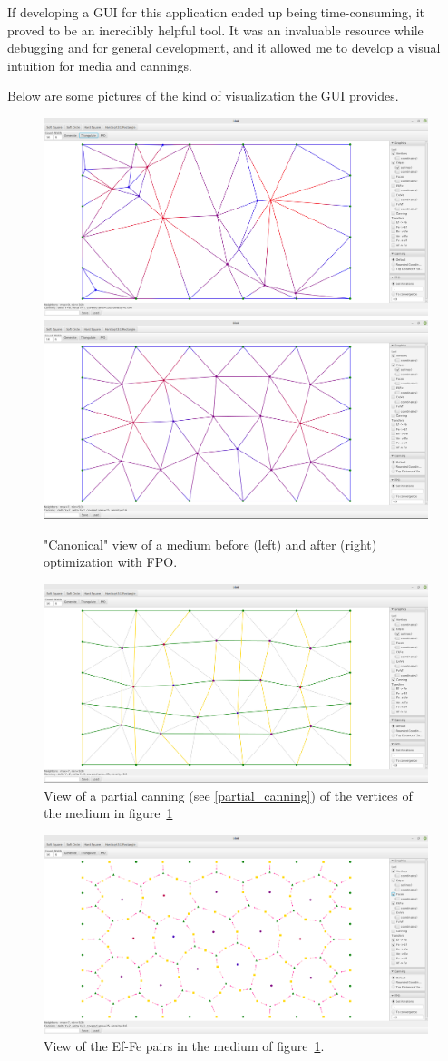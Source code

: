 \documentclass{article}
\begin{document}
If developing a GUI for this application ended up being time-consuming, it proved to be an incredibly helpful tool. It was an invaluable resource while debugging and for general development, and it allowed me to develop a visual intuition for media and cannings.
$ $

Below are some pictures of the kind of visualization the GUI provides.

\begin{figure}[h]
	\centering\includegraphics[width=0.45\linewidth]{assets/canonical_before.png}
	\centering\includegraphics[width=0.45\linewidth]{assets/canonical_after.png}
	\caption{"Canonical" view of a medium before (left) and after (right) optimization with FPO.}
	\label{fig:gui_before_after_FPO}
\end{figure}

\begin{figure}[h]
	\centering\includegraphics[width=0.8\linewidth]{assets/canning_view.png}
	\caption{View of a partial canning (see \ref{partial_canning}) of the vertices of the medium in figure~\ref{fig:gui_before_after_FPO}}
	\label{fig:gui_canning}
\end{figure}

\begin{figure}[h]
	\centering\includegraphics[width=0.8\linewidth]{assets/EfFe_transfers.png}
	\caption{View of the Ef-Fe pairs in the medium of figure~\ref{fig:gui_before_after_FPO}.}
	\label{fig:gui_EfFe}
\end{figure}
\end{document}
